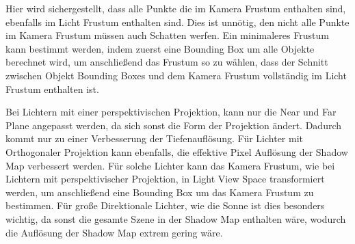 Hier wird sichergestellt, dass alle Punkte die im Kamera Frustum enthalten sind, ebenfalls im
Licht Frustum enthalten sind. Dies ist unnötig, den nicht alle Punkte im Kamera Frustum müssen auch Schatten werfen.
Ein minimaleres Frustum kann bestimmt werden, indem zuerst eine Bounding Box um alle Objekte berechnet wird,
um anschließend das Frustum so zu wählen, 
dass der Schnitt zwischen Objekt Bounding Boxes und dem Kamera Frustum vollständig im
Licht Frustum enthalten ist.
\par
Bei Lichtern mit einer perspektivischen Projektion, kann nur die Near und Far Plane angepasst werden, da sich sonst die Form der Projektion
ändert. 
Dadurch kommt nur zu einer Verbesserung der Tiefenauflösung.
Für Lichter mit Orthogonaler Projektion kann ebenfalls, die effektive Pixel Auflösung der Shadow Map verbessert werden.
Für solche Lichter kann das Kamera Frustum, wie bei Lichtern mit perspektivischer Projektion, in Light View Space 
transformiert werden, um anschließend eine Bounding Box um das Kamera Frustum zu bestimmen. 
Für große Direktionale Lichter, wie die Sonne ist dies besonders wichtig, da sonst die gesamte Szene in der Shadow Map enthalten wäre,
wodurch die Auflösung der Shadow Map extrem gering wäre.

